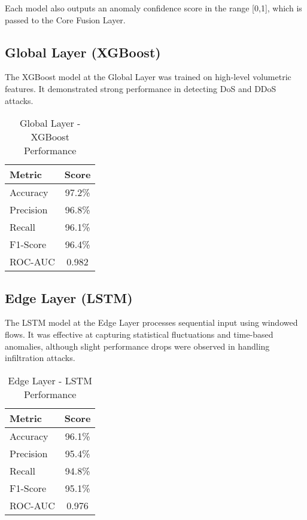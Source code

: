 \documentclass[conference]{IEEEtran}
\begin{document}
Each model also outputs an anomaly confidence score in the range [0,1], which is passed to the Core Fusion Layer.

\subsection{Global Layer (XGBoost)}
The XGBoost model at the Global Layer was trained on high-level volumetric features. It demonstrated strong performance in detecting DoS and DDoS attacks.

\begin{table}[htbp]
\caption{Global Layer - XGBoost Performance}
\begin{center}
\begin{tabular}{|l|c|}
\hline
Metric & Score \\
\hline
Accuracy & 97.2\% \\
Precision & 96.8\% \\
Recall & 96.1\% \\
F1-Score & 96.4\% \\
ROC-AUC & 0.982 \\
\hline
\end{tabular}
\label{tab:global_results}
\end{center}
\end{table}

\subsection{Edge Layer (LSTM)}
The LSTM model at the Edge Layer processes sequential input using windowed flows. It was effective at capturing statistical fluctuations and time-based anomalies, although slight performance drops were observed in handling infiltration attacks.

\begin{table}[htbp]
\caption{Edge Layer - LSTM Performance}
\begin{center}
\begin{tabular}{|l|c|}
\hline
Metric & Score \\
\hline
Accuracy & 96.1\% \\
Precision & 95.4\% \\
Recall & 94.8\% \\
F1-Score & 95.1\% \\
ROC-AUC & 0.976 \\
\hline
\end{tabular}
\label{tab:edge_results}
\end{center}
\end{table}
\end{document}
